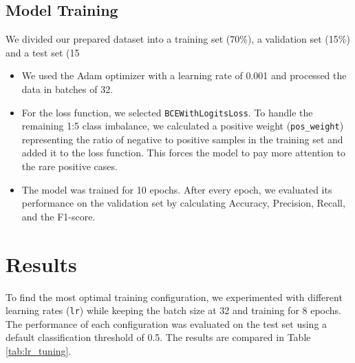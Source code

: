 \documentclass{IEEEtran}
\begin{document}
\subsection{Model Training}
We divided our prepared dataset into a training set (70\%), a validation set (15\%) and a test set (15%
\begin{itemize}
    \item We used the Adam optimizer with a learning rate of 0.001 and processed the data in batches of 32.
    \item For the loss function, we selected \texttt{BCEWithLogitsLoss}. To handle the remaining 1:5 class imbalance, we calculated a positive weight (\texttt{pos\_weight}) representing the ratio of negative to positive samples in the training set and added it to the loss function. This forces the model to pay more attention to the rare positive cases.
    \item The model was trained for 10 epochs. After every epoch, we evaluated its performance on the validation set by calculating Accuracy, Precision, Recall, and the F1-score.
\end{itemize}
\section{Results}
To find the most optimal training configuration, we experimented with different learning rates (\texttt{lr}) while keeping the batch size at 32 and training for 8 epochs. The performance of each configuration was evaluated on the test set using a default classification threshold of 0.5. The results are compared in Table \ref{tab:lr_tuning}.

\begin{table}[h]
    \centering
    \caption{Comparison of model performance with different learning rates.}
    \label{tab:lr_tuning}
\end{table}
\end{document}
